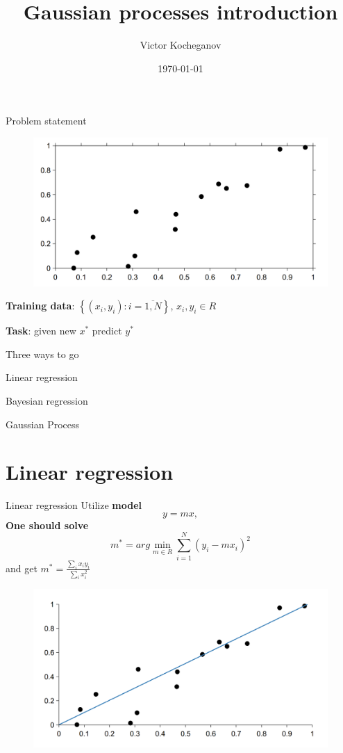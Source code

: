 \documentclass[12pt]{beamer}
\begin{document}
\title{Gaussian processes introduction}
\author{Victor Kocheganov}
\date{\today} 

\begin{frame}
\titlepage
\end{frame}

\begin{frame}{Problem statement}
\begin{figure}
\includegraphics[scale=0.2]{Regression_1.png} 
\end{figure}
\textbf{Training data}: $\left\{(x_i, y_i) \colon i=\overline{1,N} \right\}$, $x_i, y_i \in R$

\textbf{Task}: given new $x^*$ predict $y^*$
\end{frame}

\begin{frame}{Three ways to go}
\begin{block}{Linear regression}
\end{block}
\begin{block}{Bayesian regression}
\end{block}
\begin{block}{Gaussian Process}
\end{block}
\end{frame}

\section{Linear regression}
\begin{frame}{Linear regression}
Utilize \textbf{model} 
$$
y = m x,
$$
\textbf{One should solve}
$$
m^* = arg\min_{m \in R} \sum_{i=1}^{N} (y_i - m  x_i)^2
$$
and get $m^*=\frac{\sum_ix_i y_i}{\sum_i x_i^2}$
\begin{figure}
\includegraphics[scale=0.15]{Regression_2.png} 
\end{figure}
\end{frame}
\end{document}
